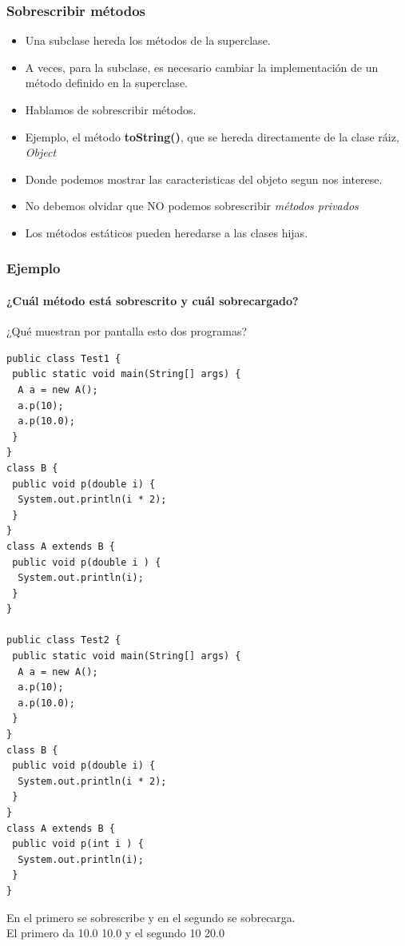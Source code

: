 \documentclass{beamer}
\begin{document}
\begin{frame}[fragile]
    \frametitle{Sobrescribir métodos}
   \begin{itemize}[<+->]
   \item Una subclase hereda los métodos de la superclase.
   \item A veces, para la subclase, es necesario cambiar la implementación de un método definido en la superclase.
   \item Hablamos de sobrescribir métodos.
   \item Ejemplo, el método \textbf{toString()}, que se hereda directamente de la clase ráiz, \emph{Object}
   \item Donde podemos mostrar las caracteristicas del objeto segun nos interese.
   \item No debemos olvidar que NO podemos sobrescribir \emph{métodos privados}
   \item Los métodos estáticos pueden heredarse a las clases hijas.
   
   \end{itemize}
\end{frame}


\begin{frame}[fragile]
\frametitle{Ejemplo}
\framesubtitle{¿Cuál método está sobrescrito y cuál sobrecargado?}
\begin{center}
\alert{¿Qué muestran por pantalla esto dos programas?}
\end{center}
\begin{tiny}
\begin{multicols}{2}
\begin{verbatim}
public class Test1 { 
 public static void main(String[] args) { 
  A a = new A(); 
  a.p(10); 
  a.p(10.0); 
 } 
}
class B { 
 public void p(double i) { 
  System.out.println(i * 2); 
 } 
}
class A extends B { 
 public void p(double i ) { 
  System.out.println(i); 
 } 
}

public class Test2 {
 public static void main(String[] args) {
  A a = new A();
  a.p(10);
  a.p(10.0);
 }
}
class B {
 public void p(double i) {
  System.out.println(i * 2);
 }
}
class A extends B {
 public void p(int i ) {
  System.out.println(i);
 }
}
\end{verbatim}
\end{multicols}
\end{tiny}
\pause
\begin{center}
\alert{En el primero se sobrescribe y en el segundo se sobrecarga.}\\
\pause
\alert{El primero da 10.0 10.0 y el segundo 10 20.0}
\end{center}
\end{frame}
\end{document}
